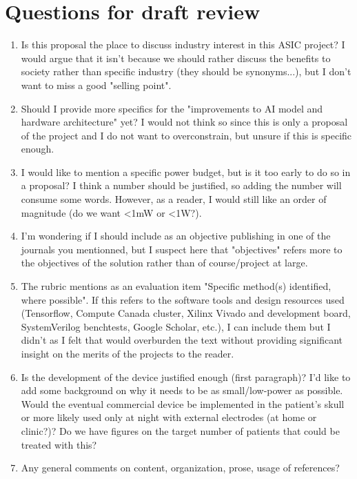 \documentclass[12pt]{article}
\begin{document}
\section{Questions for draft review}
\begin{enumerate}
    \item Is this proposal the place to discuss industry interest in this ASIC project? I would argue that it isn't because we should rather discuss the benefits to society rather than specific industry (they should be synonyms...), but I don't want to miss a good "selling point".
    \item Should I provide more specifics for the "improvements to AI model and hardware architecture" yet? I would not think so since this is only a proposal of the project and I do not want to overconstrain, but unsure if this is specific enough.
    \item I would like to mention a specific power budget, but is it too early to do so in a proposal? I think a number should be justified, so adding the number will consume some words. However, as a reader, I would still like an order of magnitude (do we want <1mW or <1W?).
    \item I'm wondering if I should include as an objective publishing in one of the journals you mentionned, but I suspect here that "objectives" refers more to the objectives of the solution rather than of course/project at large.
    \item The rubric mentions as an evaluation item "Specific method(s) identified, where possible". If this refers to the software tools and design resources used (Tensorflow, Compute Canada cluster, Xilinx Vivado and development board, SystemVerilog benchtests, Google Scholar, etc.), I can include them but I didn't as I felt that would overburden the text without providing significant insight on the merits of the projects to the reader.
    \item Is the development of the device justified enough (first paragraph)? I'd like to add some background on why it needs to be as small/low-power as possible. Would the eventual commercial device be implemented in the patient's skull or more likely used only at night with external electrodes (at home or clinic?)? Do we have figures on the target number of patients that could be treated with this?
    \item Any general comments on content, organization, prose, usage of references?
\end{enumerate}
\end{document}
